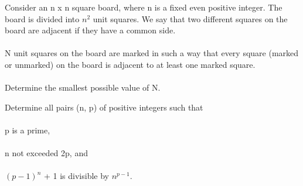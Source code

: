 

\item Consider an n x n square board, where n is a fixed even positive integer. The board is divided into $n^2$ unit squares. We say that two different squares on the board are adjacent if they have a common side.\\
\\ N unit squares on the board are marked in such a way that every square (marked or unmarked) on the board is adjacent to at least one marked square.\\
\\ Determine the smallest possible value of N.\\

\item Determine all pairs (n, p) of positive integers such that\\
\\ p is a prime,\\
\\ n not exceeded 2p, and\\
\\ $(p - 1)^n$ + 1 is divisible by $n^{p-1}$.






